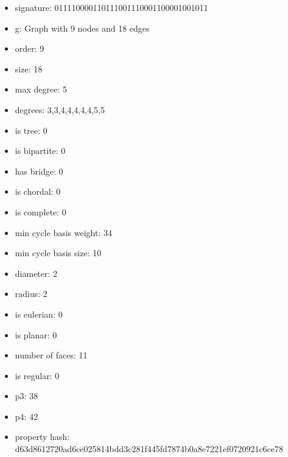 \newpage
\begin{figure}
\end{figure}
\begin{itemize}
\item signature: 011110000110111001110001100001001011
\item g: Graph with 9 nodes and 18 edges
\item order: 9
\item size: 18
\item max degree: 5
\item degrees: 3,3,4,4,4,4,4,5,5
\item is tree: 0
\item is bipartite: 0
\item has bridge: 0
\item is chordal: 0
\item is complete: 0
\item min cycle basis weight: 34
\item min cycle basis size: 10
\item diameter: 2
\item radius: 2
\item is eulerian: 0
\item is planar: 0
\item number of faces: 11
\item is regular: 0
\item p3: 38
\item p4: 42
\item property hash: d63d8612720ad6ce025814bdd3c281f445fd7874b0a8e7221ef0720921c6ce78
\end{itemize}
